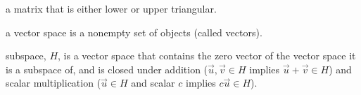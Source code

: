 \documentclass[a4paper,12pt]{article}
\theoremstyle{definition}
\theoremstyle{definition}
\begin{document}
\begin{description}[style=nextline]
		\item[triangular matrix] a matrix that is either lower or upper triangular.
		
		\item[vector space] a vector space is a nonempty set of objects (called vectors).
		
		\item[subspace] subspace, $H$, is a vector space that contains the zero vector of the vector space it is a subspace of, and is closed under addition ($\vec{u}, \vec{v} \in H$ implies $\vec{u} + \vec{v} \in H$) and scalar multiplication ($\vec{u}\in H$ and scalar $c$ implies $c\vec{u} \in H$).
	\end{description}
\end{document}

